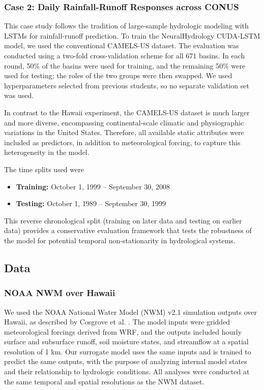 \documentclass{article}
\begin{document}
\subsubsection{Case 2: Daily Rainfall-Runoff Responses across CONUS}
\label{sec:cs2}

This case study follows the tradition of large-sample hydrologic modeling with LSTMs for rainfall-runoff prediction. To train the NeuralHydrology CUDA-LSTM model, we used the conventional CAMELS-US dataset. The evaluation was conducted using a two-fold cross-validation scheme for all 671 basins. In each round, 50\% of the basins were used for training, and the remaining 50\% were used for testing; the roles of the two groups were then swapped. We used hyperparameters selected from previous students, so no separate validation set was used.

In contrast to the Hawaii experiment, the CAMELS-US dataset is much larger and more diverse, encompassing continental-scale climatic and physiographic variations in the United States. Therefore, all available static attributes were included as predictors, in addition to meteorological forcing, to capture this heterogeneity in the model.

The time splits used were
\begin{itemize}
    \item \textbf{Training:} October 1, 1999 -- September 30, 2008
    \item \textbf{Testing:} October 1, 1989 -- September 30, 1999
\end{itemize}

This reverse chronological split (training on later data and testing on earlier data) provides a conservative evaluation framework that tests the robustness of the model for potential temporal non-stationarity in hydrological systems.

\subsection{Data}

\subsubsection{NOAA NWM over Hawaii}
We used the NOAA National Water Model (NWM) v2.1 simulation outputs over Hawaii, as described by Cosgrove et al. \cite{cosgrove2024noaa}. The model inputs were gridded meteorological forcings derived from WRF, and the outputs included hourly surface and subsurface runoff, soil moisture states, and streamflow at a spatial resolution of 1 km. Our surrogate model uses the same inputs and is trained to predict the same outputs, with the purpose of analyzing internal model states and their relationship to hydrologic conditions. All analyses were conducted at the same temporal and spatial resolutions as the NWM dataset.
\end{document}
